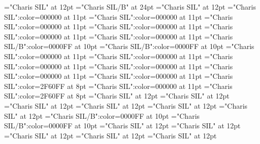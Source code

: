 \documentclass[a4paper]{article}
\begin{document}
\pagestyle{plain}
\sloppy
\setlength{\parfillskip}{0pt plus 1fil}
\font{}="Charis SIL" at 12pt
\font{}="Charis SIL/B" at 24pt
\font{}="Charis SIL" at 12pt
\font\entryletDatadicBody="Charis SIL":color=000000 at 11pt
\font\pictureRightentryletDatadicBody="Charis SIL":color=000000 at 11pt
\font\picturepictureRightentryletDatadicBody="Charis SIL":color=000000 at 11pt
\font\pictureCaptionpictureRightentryletDatadicBody="Charis SIL":color=000000 at 11pt
\font\CmPicturepublishStemCaptionSenseNumberpictureCaptionpictureRightentryletDatadicBody="Charis SIL":color=000000 at 11pt
\font\CmPicturepublishStemCaptionCaptionPubptpictureCaptionpictureRightentryletDatadicBody="Charis SIL":color=000000 at 11pt
\font\headwordsehentryletDatadicBody="Charis SIL/B":color=0000FF at 10pt
\font\headwordafterentryletDatadicBody="Charis SIL/B":color=0000FF at 10pt
\font\sensesentryletDatadicBody="Charis SIL":color=000000 at 11pt
\font\sensesensesentryletDatadicBody="Charis SIL":color=000000 at 11pt
\font\grammaticalinfosensesensesentryletDatadicBody="Charis SIL":color=000000 at 11pt
\font\partofspeechptgrammaticalinfosensesensesentryletDatadicBody="Charis SIL":color=000000 at 11pt
\font{}="Charis SIL":color=000000 at 11pt
\font\xitemptdefinitionLcptsensesensesentryletDatadicBody="Charis SIL":color=000000 at 11pt
\font\xlanguagetagenxitemptdefinitionLcptsensesensesentryletDatadicBody="Charis SIL":color=2F60FF at 8pt
\font\xitemendefinitionLcptsensesensesentryletDatadicBody="Charis SIL":color=000000 at 11pt
\font\xlanguagetagenxitemendefinitionLcptsensesensesentryletDatadicBody="Charis SIL":color=2F60FF at 8pt
\font\entrybletDatadicBody="Charis SIL" at 12pt
\font\pictureRightentrybletDatadicBody="Charis SIL" at 12pt
\font\picturepictureRightentrybletDatadicBody="Charis SIL" at 12pt
\font\pictureCaptionpictureRightentrybletDatadicBody="Charis SIL" at 12pt
\font\CmPicturepublishStemCaptionSenseNumberpictureCaptionpictureRightentrybletDatadicBody="Charis SIL" at 12pt
\font\CmPicturepublishStemCaptionCaptionPubptpictureCaptionpictureRightentrybletDatadicBody="Charis SIL" at 12pt
\font\headwordsehentrybletDatadicBody="Charis SIL/B":color=0000FF at 10pt
\font\headwordafterentrybletDatadicBody="Charis SIL/B":color=0000FF at 10pt
\font\sensesentrybletDatadicBody="Charis SIL" at 12pt
\font\sensesensesentrybletDatadicBody="Charis SIL" at 12pt
\font\grammaticalinfosensesensesentrybletDatadicBody="Charis SIL" at 12pt
\font\partofspeechptgrammaticalinfosensesensesentrybletDatadicBody="Charis SIL" at 12pt
\font{}="Charis SIL" at 12pt
\end{document}
